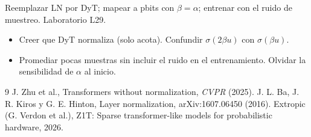 \documentclass[11pt,a4paper]{article}
\begin{document}
\begin{aplicacion}
Reemplazar LN por DyT; mapear a pbits con $\beta=\alpha$; entrenar con el ruido de muestreo. Laboratorio L29.
\end{aplicacion}

\begin{error}
\begin{itemize}[nosep]
\item Creer que DyT normaliza (solo acota). \quad Confundir $\sigma(2\beta u)$ con $\sigma(\beta u)$.
\item Promediar pocas muestras sin incluir el ruido en el entrenamiento. \quad Olvidar la sensibilidad de $\alpha$ al inicio.
\end{itemize}
\end{error}

\begin{thebibliography}{9}\small
{} J. Zhu et al., Transformers without normalization, \emph{CVPR} (2025).
 J. L. Ba, J. R. Kiros y G. E. Hinton, Layer normalization, arXiv:1607.06450 (2016).
 Extropic (G. Verdon et al.), Z1T: Sparse transformer-like models for probabilistic hardware, 2026.
\end{thebibliography}
\end{document}
